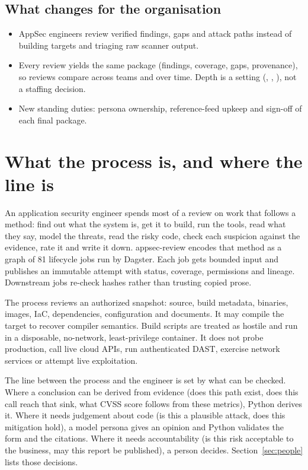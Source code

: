 \documentclass[10pt,a4paper]{article}
\begin{document}
\subsection*{What changes for the organisation}
\begin{itemize}
\item AppSec engineers review verified findings, gaps and attack paths instead of building targets
and triaging raw scanner output.
\item Every review yields the same package (findings, coverage, gaps, provenance), so reviews compare
across teams and over time. Depth is a setting (, , ), not
a staffing decision.
\item New standing duties: persona ownership, reference-feed upkeep and sign-off of each final package.
\end{itemize}

\newpage
\tableofcontents

\section{What the process is, and where the line is}
An application security engineer spends most of a review on work that follows a method: find out what
the system is, get it to build, run the tools, read what they say, model the threats, read the risky
code, check each suspicion against the evidence, rate it and write it down. appsec-review encodes that
method as a graph of 81 lifecycle jobs run by Dagster. Each job gets bounded input and publishes an
immutable attempt with status, coverage, permissions and lineage. Downstream jobs re-check hashes
rather than trusting copied prose.

The process reviews an authorized snapshot: source, build metadata, binaries, images, IaC,
dependencies, configuration and documents. It may compile the target to recover compiler semantics.
Build scripts are treated as hostile and run in a disposable, no-network, least-privilege container.
It does not probe production, call live cloud APIs, run authenticated DAST, exercise network services
or attempt live exploitation.

The line between the process and the engineer is set by what can be checked. Where a conclusion can be
derived from evidence (does this path exist, does this call reach that sink, what CVSS score follows
from these metrics), Python derives it. Where it needs judgement about code (is this a plausible
attack, does this mitigation hold), a model persona gives an opinion and Python validates the form
and the citations. Where it needs accountability (is this risk acceptable to the business, may this
report be published), a person decides. Section~\ref{sec:people} lists those decisions.
\end{document}
